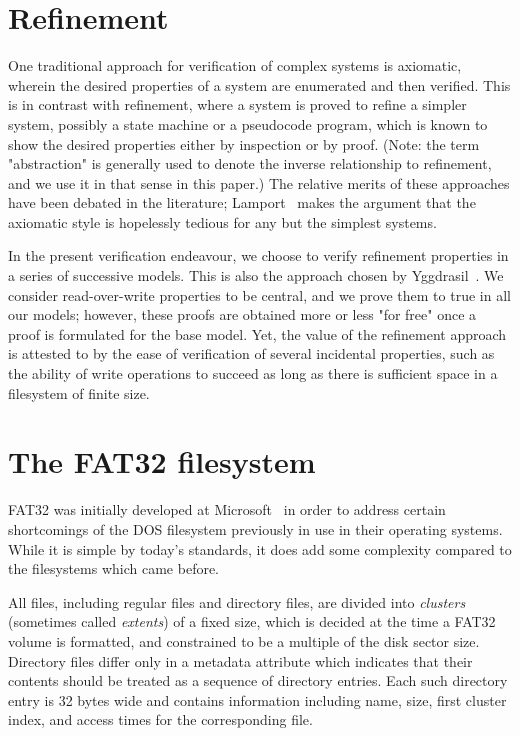\documentclass[runningheads,a4paper]{llncs}
\begin{document}
\section{Refinement}

One traditional approach for verification of complex systems is
axiomatic, wherein the desired properties of a system are enumerated
and then verified. This is in contrast with refinement,
where a system is proved to refine a simpler system, possibly a state
machine or a pseudocode program, which is known to show the desired
properties either by inspection or by proof. (Note: the term
"abstraction" is generally used to denote the inverse relationship to
refinement, and we use it in that sense in this paper.) The relative
merits of these approaches have been debated in the literature;
Lamport~\cite{lamport1993verification} makes the argument that the
axiomatic style is hopelessly tedious for any but the simplest
systems.

In the present verification endeavour, we choose to verify
refinement properties in a series of successive models. This is also
the approach chosen by Yggdrasil~\cite{sigurbjarnarson2016push}. We
consider read-over-write properties to be central, and we prove them
to true in all our models; however, these proofs are obtained more or
less "for free" once a proof is formulated for the base model. Yet,
the value of the refinement approach is attested to by the ease of
verification of several incidental properties, such as the ability of
write operations to succeed as long as there is sufficient space in a
filesystem of finite size.

\section{The FAT32 filesystem}

FAT32 was initially developed at Microsoft~\cite{microsoft_2000} in
order to address certain shortcomings of the DOS filesystem previously
in use in their operating systems. While it is simple by today's
standards, it does add some complexity compared to the filesystems
which came before.

All files, including regular files and directory files, are divided into
\textit{clusters} (sometimes called \textit{extents}) of a fixed size,
which is decided at the time a FAT32 volume is formatted, and
constrained to be a multiple of the disk sector size. Directory files
differ only in a metadata attribute which indicates that their contents
should be treated as a sequence of directory entries. Each such
directory entry is 32 bytes wide and contains information including
name, size, first cluster index, and access times for the
corresponding file.
\end{document}
